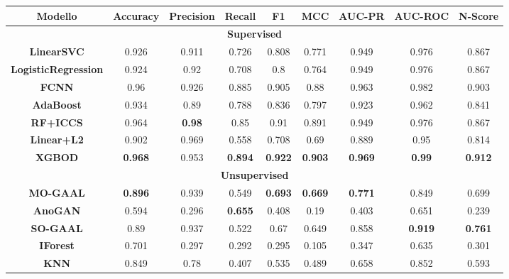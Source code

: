 \begin{table}[h]
    \centering
    \begin{adjustbox}{max width=\textwidth}
        \begin{tabular}{|c|c|c|c|c|c|c|c|c|}
        \hline
            \textbf{Modello} & \textbf{Accuracy} &\textbf{Precision}  & \textbf{Recall} & \textbf{F1} & \textbf{MCC} & \textbf{AUC-PR} & \textbf{AUC-ROC} & \textbf{N-Score}\\
            \hline
            \multicolumn{9}{|c|}{\textbf{Supervised}} \\
            \hline
            \textbf{LinearSVC} & 0.926 & 0.911 & 0.726 &0.808  & 0.771 & 0.949 & 0.976 &0.867 \\
            \hline
             \textbf{LogisticRegression}& 0.924 & 0.92 & 0.708 & 0.8 & 0.764 & 0.949 & 0.976 & 0.867 \\
             \hline
             \textbf{FCNN}& 0.96 & 0.926 & 0.885 & 0.905 & 0.88 & 0.963 & 0.982 & 0.903 \\
             \hline
             \textbf{AdaBoost}& 0.934 & 0.89 & 0.788 & 0.836 & 0.797 & 0.923 & 0.962 & 0.841 \\
             \hline
             \textbf{RF+ICCS}& 0.964 &\textbf{ 0.98} & 0.85 & 0.91 & 0.891 & 0.949 & 0.976 & 0.867 \\
             \hline
             \textbf{Linear+L2}& 0.902 & 0.969 & 0.558 & 0.708 & 0.69 & 0.889 & 0.95 & 0.814 \\
             \hline
             \textbf{XGBOD}& \textbf{0.968} & 0.953 & \textbf{0.894} & \textbf{0.922} & \textbf{0.903} & \textbf{0.969} & \textbf{0.99} & \textbf{0.912} \\
             \hline
             \multicolumn{9}{|c|}{\textbf{Unsupervised}} \\
             \hline
             \textbf{MO-GAAL} & \textbf{0.896 }& 0.939 & 0.549 &\textbf{0.693}  & \textbf{0.669} & \textbf{0.771} & 0.849 &0.699 \\
        \hline
         \textbf{AnoGAN}& 0.594 & 0.296 & \textbf{0.655} & 0.408 & 0.19 & 0.403 & 0.651 & 0.239 \\
         \hline
         \textbf{SO-GAAL}& 0.89 & 0.937 & 0.522 & 0.67 & 0.649 & 0.858 & \textbf{0.919} & \textbf{0.761} \\
         \hline
         \textbf{IForest}& 0.701 & 0.297 & 0.292 & 0.295 & 0.105 & 0.347 & 0.635 & 0.301 \\
         \hline
         \textbf{KNN}& 0.849 & 0.78 & 0.407 & 0.535 & 0.489 & 0.658 & 0.852 & 0.593 \\

\end{tabular}
\end{adjustbox}
\end{table}
